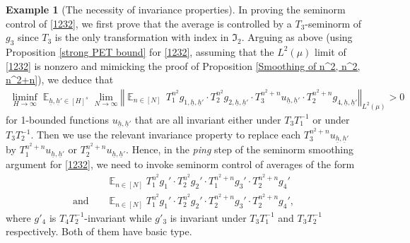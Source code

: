 \documentclass[11pt]{amsart}
\theoremstyle{definition}
\newtheorem{example}{Example}
\newcommand{\FI}{{\mathfrak I}}
\renewcommand{\b}{{\textbf{b}}}
\newcommand{\uh}{{\underline{h}}}
\newcommand{\norm}[1]{\left\Vert #1\right\Vert}
\newcommand{\inv}{^{-1}}
\DeclareMathOperator*{\E}{\mathbb{E}}
\begin{document}
\begin{example}[The necessity of invariance properties]
In proving the seminorm control of \eqref{1232}, we first prove that the average is controlled by a $T_3$-seminorm of $g_3$ since $T_3$ is the only transformation with index in $\FI_2$. Arguing as above (using Proposition \ref{strong PET bound} for \eqref{1232}, assuming that the $L^2(\mu)$ limit of \eqref{1232} is nonzero and mimicking the proof of Proposition \ref{Smoothing of n^2, n^2, n^2+n}), we deduce that
\begin{align*}
    \liminf_{H\to\infty}\E_{\uh,\uh'\in [H]^{s}}\lim_{N\to\infty}\norm{ \E_{n\in[N]} \, T_1^{n^2} g_{1, \uh, \uh'}\cdot T_2^{n^2} g_{2, \uh, \uh'}\cdot T_3^{n^2+n}u_{\uh, \uh'}\cdot T_2^{n^2+n}g_{4, \uh,\uh'}}_{L^2(\mu)}>0
\end{align*}
for 1-bounded functions $u_{\uh, \uh'}$ that are all invariant either under $T_3 T_1\inv$ or under $T_3 T_2\inv$. Then we use the relevant invariance property to replace each $T_3^{n^2+n} u_{\uh, \uh'}$ by $T_1^{n^2+n} u_{\uh, \uh'}$ or $T_2^{n^2+n} u_{\uh, \uh'}$. Hence, in the \textit{ping} step of the seminorm smoothing argument for \eqref{1232}, we need to invoke seminorm control of averages of the form
\begin{align}
\nonumber    &\E_{n\in[N]}T_1^{n^2} g_1'\cdot T_2^{n^2} g_2'\cdot T_1^{n^2+n}g_3'\cdot T_2^{n^2+n}g_4'\\
\label{1222}    \textrm{and}\quad & \E_{n\in[N]}T_1^{n^2} g_1'\cdot T_2^{n^2} g_2'\cdot T_2^{n^2+n}g_3'\cdot T_2^{n^2+n}g_4',
\end{align}
where $g'_4$ is $T_4 T_2\inv$-invariant while $g'_3$ is invariant under $T_3 T_1\inv$ and $T_3 T_2\inv$ respectively. Both of them have basic type.


\end{example}
\end{document}
